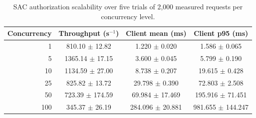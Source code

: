 \begin{table}[t]
\centering
\caption{SAC authorization scalability over five trials of 2,000 measured requests per concurrency level.}
\label{tab:docker-sac-scalability}
\begin{tabular}{rccc}
\hline
\textbf{Concurrency} & \textbf{Throughput (s$^{-1}$)} & \textbf{Client mean (ms)} & \textbf{Client p95 (ms)} \\
\hline
1 & 810.10 $\pm$ 12.82 & 1.220 $\pm$ 0.020 & 1.586 $\pm$ 0.065 \\
5 & 1365.14 $\pm$ 17.15 & 3.600 $\pm$ 0.045 & 5.799 $\pm$ 0.190 \\
10 & 1134.59 $\pm$ 27.00 & 8.738 $\pm$ 0.207 & 19.615 $\pm$ 0.428 \\
25 & 825.82 $\pm$ 13.72 & 29.798 $\pm$ 0.390 & 72.803 $\pm$ 2.508 \\
50 & 723.39 $\pm$ 174.59 & 69.984 $\pm$ 17.469 & 195.916 $\pm$ 71.451 \\
100 & 345.37 $\pm$ 26.19 & 284.096 $\pm$ 20.881 & 981.655 $\pm$ 144.247 \\
\hline
\end{tabular}
\end{table}
